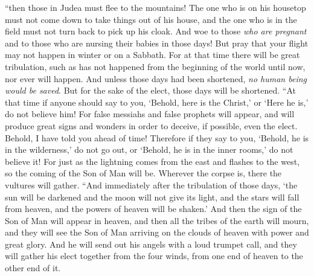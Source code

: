 \begin{biblechapter}
\verse “then those in Judea must flee to the mountains!
\verse The one who is on his housetop must not come down to take things out of his house,
\verse and the one who is in the field must not turn back to pick up his cloak.
\verse And woe to those \textit{who are pregnant} and to those who are nursing their babies in those days!
\verse But pray that your flight may not happen in winter or on a Sabbath.
\verse For at that time there will be great tribulation, such as has not happened from the beginning of the world until now, nor ever will happen.
\verse And unless those days had been shortened, \textit{no human being would be saved}. But for the sake of the elect, those days will be shortened.
\verse “At that time if anyone should say to you, ‘Behold, here is the Christ,’ or ‘Here he is,’ do not believe him!
\verse For false messiahs and false prophets will appear, and will produce great signs and wonders in order to deceive, if possible, even the elect.
\verse Behold, I have told you ahead of time!
\verse Therefore if they say to you, ‘Behold, he is in the wilderness,’ do not go out, or ‘Behold, he is in the inner rooms,’ do not believe it!
\verse For just as the lightning comes from the east and flashes to the west, so the coming of the Son of Man will be.
\verse Wherever the corpse is, there the vultures will gather.
 “And immediately after the tribulation of those days, ‘the sun will be darkened 
and the moon will not give its light, 
and the stars will fall from heaven, 
and the powers of heaven will be shaken.’
\verse And then the sign of the Son of Man will appear in heaven, and then all the tribes of the earth will mourn, and they will see the Son of Man arriving on the clouds of heaven with power and great glory.
\verse And he will send out his angels with a loud trumpet call, and they will gather his elect together from the four winds, from one end of heaven to the other end of it.

\end{biblechapter}
